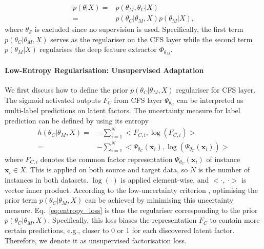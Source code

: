 \documentclass[letterpaper]{article} \usepackage{aaai19}  \usepackage{times}  \usepackage{helvet}  \usepackage{courier}  \usepackage{url}  \usepackage{graphicx}
\begin{document}
\begin{equation}\label{eq:prior_decomp_C_M}
\begin{split}
   p(\theta | X) = & p(\theta_M, \theta_C | X) \\
	= & p(\theta_C | \theta_M, X) p(\theta_M | X),
\end{split}
\end{equation}
where $\theta_{\mathcal{S}}$ is excluded since no supervision is used. Specifically, the first term $p(\theta_C | \theta_M, X)$ serves as the regulariser on the CFS layer while the second term $p(\theta_M | X)$ regularises the deep feature extractor $\Phi_{\theta_M}$.

\paragraph{Low-Entropy Regularisation: Unsupervised Adaptation}

We first discuss how to define the prior $p(\theta_C | \theta_M, X)$ regulariser for CFS layer. The sigmoid activated outputs $F_C$ from CFS layer $\Psi_{\theta_C}$ can be interpreted as multi-label predictions on latent factors. The uncertainty measure for label prediction can be defined by using its entropy
\begin{equation}\label{eq:entropy_loss}
\begin{split}
	h(\theta_C | \theta_M, X) = &- \sum_{i=1}^{N} <F_{C,i}, \log(F_{C,i})>\\
	                                         =& - \sum_{i=1}^{N} <\Psi_{\theta_C}(\mathbf{x}_i), \log(\Psi_{\theta_C}(\mathbf{x}_i))>
\end{split}
\end{equation}
where $F_{C,i}$ denotes the common factor representation $\Psi_{\theta_C}(\mathbf{x}_i)$ of instance $\mathbf{x}_i \in X$. This is applied on both source and target data, so $N$  is the number of instances in both datasets. $\log(\cdot)$ is applied element-wise, and $<\cdot,\ \cdot>$ is vector inner product.
According to the low-uncertainty criterion \cite{carlucci2017autodial}, optimising the prior term $p(\theta_C | \theta_M, X)$ can be achieved by minimising this uncertainty measure. Eq.~\ref{eq:entropy_loss} is thus the regulariser corresponding to the prior $p(\theta_C | \theta_M, X)$. 
Specifically, this loss biases the representation $F_C$ to contain more certain predictions, e.g., closer to 0 or 1 for each discovered latent factor. Therefore, we denote it as unsupervised factorisation loss.
\end{document}
